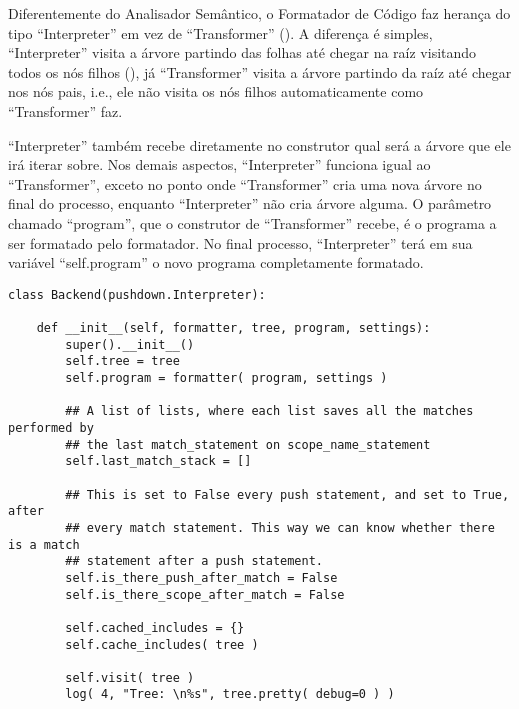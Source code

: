 Diferentemente do Analisador Semântico,
o Formatador de Código faz herança do tipo ``Interpreter'' em vez de ``Transformer'' ().
A diferença é simples,
``Interpreter'' visita a árvore partindo das folhas até chegar na raíz visitando todos os nós filhos (),
já ``Transformer'' visita a árvore partindo da raíz até chegar nos nós pais,
i.e.,
ele não visita os nós filhos automaticamente como ``Transformer'' faz.

``Interpreter'' também recebe diretamente no construtor qual será a árvore que ele irá iterar sobre.
Nos demais aspectos,
``Interpreter'' funciona igual ao ``Transformer'',
exceto no ponto onde ``Transformer'' cria uma nova árvore no final do processo,
enquanto ``Interpreter'' não cria árvore alguma.
O parâmetro chamado ``program'',
que o construtor de ``Transformer'' recebe,
é o programa a ser formatado pelo formatador.
No final processo,
``Interpreter'' terá em sua variável ``self.program'' o novo programa completamente formatado.
\begin{lstlisting}[caption={Construtor do Formatador},label={construtorDoFormatador},style=python_style]
class Backend(pushdown.Interpreter):

    def __init__(self, formatter, tree, program, settings):
        super().__init__()
        self.tree = tree
        self.program = formatter( program, settings )

        ## A list of lists, where each list saves all the matches performed by
        ## the last match_statement on scope_name_statement
        self.last_match_stack = []

        ## This is set to False every push statement, and set to True, after
        ## every match statement. This way we can know whether there is a match
        ## statement after a push statement.
        self.is_there_push_after_match = False
        self.is_there_scope_after_match = False

        self.cached_includes = {}
        self.cache_includes( tree )

        self.visit( tree )
        log( 4, "Tree: \n%s", tree.pretty( debug=0 ) )
\end{lstlisting}

